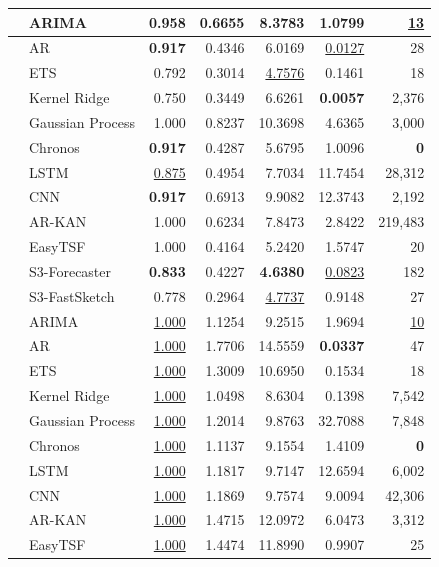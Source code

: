 \begin{table}[p]
\begin{tabular}{|>{\centering\arraybackslash}p{1.15cm}|>{\raggedright\arraybackslash}p{2.25cm}|r|r|r|r|r|}
\cline{2-7}
 & ARIMA & 0.958 & 0.6655 & 8.3783 & 1.0799 & \underline{13} \\
\cline{2-7}
 & AR & \textbf{0.917} & 0.4346 & 6.0169 & \underline{0.0127} & 28 \\
\cline{2-7}
 & ETS & 0.792 & 0.3014 & \underline{4.7576} & 0.1461 & 18 \\
\cline{2-7}
 & Kernel Ridge & 0.750 & 0.3449 & 6.6261 & \textbf{0.0057} & 2,376 \\
\cline{2-7}
 & Gaussian Process & 1.000 & 0.8237 & 10.3698 & 4.6365 & 3,000 \\
\cline{2-7}
 & Chronos & \textbf{0.917} & 0.4287 & 5.6795 & 1.0096 & \textbf{0} \\
\cline{2-7}
 & LSTM & \underline{0.875} & 0.4954 & 7.7034 & 11.7454 & 28,312 \\
\cline{2-7}
 & CNN & \textbf{0.917} & 0.6913 & 9.9082 & 12.3743 & 2,192 \\
\cline{2-7}
 & AR-KAN & 1.000 & 0.6234 & 7.8473 & 2.8422 & 219,483 \\
\cline{2-7}
 & EasyTSF & 1.000 & 0.4164 & 5.2420 & 1.5747 & 20 \\
\hline
\multirow{12}{=}{\centering M4} & S3-Forecaster & \textbf{0.833} & 0.4227 & \textbf{4.6380} & \underline{0.0823} & 182 \\
\cline{2-7}
 & S3-FastSketch & 0.778 & 0.2964 & \underline{4.7737} & 0.9148 & 27 \\
\cline{2-7}
 & ARIMA & \underline{1.000} & 1.1254 & 9.2515 & 1.9694 & \underline{10} \\
\cline{2-7}
 & AR & \underline{1.000} & 1.7706 & 14.5559 & \textbf{0.0337} & 47 \\
\cline{2-7}
 & ETS & \underline{1.000} & 1.3009 & 10.6950 & 0.1534 & 18 \\
\cline{2-7}
 & Kernel Ridge & \underline{1.000} & 1.0498 & 8.6304 & 0.1398 & 7,542 \\
\cline{2-7}
 & Gaussian Process & \underline{1.000} & 1.2014 & 9.8763 & 32.7088 & 7,848 \\
\cline{2-7}
 & Chronos & \underline{1.000} & 1.1137 & 9.1554 & 1.4109 & \textbf{0} \\
\cline{2-7}
 & LSTM & \underline{1.000} & 1.1817 & 9.7147 & 12.6594 & 6,002 \\
\cline{2-7}
 & CNN & \underline{1.000} & 1.1869 & 9.7574 & 9.0094 & 42,306 \\
\cline{2-7}
 & AR-KAN & \underline{1.000} & 1.4715 & 12.0972 & 6.0473 & 3,312 \\
\cline{2-7}
 & EasyTSF & \underline{1.000} & 1.4474 & 11.8990 & 0.9907 & 25 \\
\hline
\end{tabular}
\end{table}



